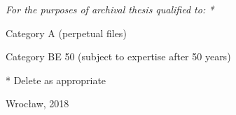 \documentclass[12pt,a4paper,twoside]{book}
\begin{document}
\begin{titlepage}
\smallskip
\begin{flushleft}
\small\itshape
For the purposes of archival thesis qualified to: *
\begin{compactenum}
\item Category A (perpetual files)
\item Category BE 50 (subject to expertise after 50 years)
\end{compactenum}
* Delete as appropriate
\end{flushleft}
\vspace*{12pt}
\begin{flushright}
\end{flushright}
\vspace*{12pt}
\begin{center}
Wrocław, 2018
\end{center}
\end{titlepage}
\restoregeometry
\end{document}
